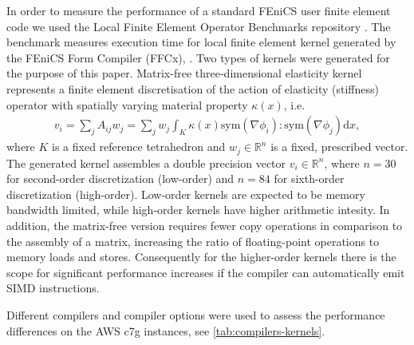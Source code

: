 In order to measure the performance of a standard FEniCS user finite element
code we used the Local Finite Element Operator Benchmarks repository
\cite{Baratta2023}. The benchmark measures execution time for local finite element
kernel generated by the FEniCS Form Compiler (FFCx), \cite{Habera2020}. Two types
of kernels were generated for the purpose of this paper. Matrix-free
three-dimensional elasticity kernel represents a finite element discretisation
of the action of elasticity (stiffness) operator with spatially varying
material property $\kappa(x)$, i.e.
\begin{align}
    v_i = \sum_j A_{ij} w_j = \sum_j w_j \int_K \kappa(x) \text{sym}(\nabla \phi_i) : \text{sym} (\nabla \phi_j) \mathrm dx,
\end{align}
where $K$ is a fixed reference tetrahedron and $w_j \in \mathbb{R}^{n}$ is a
fixed, prescribed vector. The generated kernel assembles a double precision
vector $v_i \in \mathbb{R}^{n}$, where $n = 30$ for second-order discretization
(low-order) and $n = 84$ for sixth-order discretization (high-order). Low-order
kernels are expected to be memory bandwidth limited, while high-order kernels have
higher arithmetic intesity. In addition, the matrix-free version requires fewer copy
operations in comparison to the assembly of a matrix, increasing the ratio of
floating-point operations to memory loads and stores. Consequently for the higher-order
kernels there is the scope for significant performance increases if the compiler 
can automatically emit SIMD instructions.

Different compilers and compiler options were used to assess the performance
differences on the AWS c7g instances, see \autoref{tab:compilers-kernels}.

